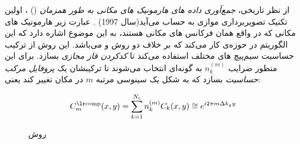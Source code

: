 از نظر تاریخی، 
\textit{جمع‌آوری داده های هارمونیک های مکانی به طور همزمان}
()
، اولین تکنیک تصویربرداری موازی به حساب می‌آید(سال 1997)
\cite{SMASH-1997}.
عبارت زیر هارمونیک های مکانی که در واقع همان فرکانس های مکانی هستند، به این موضوع اشاره دارد که  این الگوریتم در حوزه‌ی \kspace کار می‌کند که بر خلاف دو روش 
و  
می‌باشد. این روش از ترکیب حساسیت سیم‌پیچ های مختلف استفاده می‌کند تا \textit{کد‌کردن فاز مجازی} بسازد.
برای این منظور ضرایب $n_k^{(m)}$ به گونه‌ای انتخاب می‌شوند تا ترکیبشان یک \textit{پروفایل مرکب حساسیت}
 بسازد که به شکل یک سینوسی مرتبه $m$ در مکان تغییر کند یعنی:
 
 \removevspace
 \begin{equation}\label{eq:Ccomp}
 	C^\lrtext{comp}_m(x, y) =  \sum_{k=1}^{N_c}  n_k^{(m)} C_k(x,y) \cong e^{i2\pi m\Delta k_y y}
 \end{equation} 
 
 
 
\begin{figure}[t!]
	\centering
	\begin{RTLcopyrightBox}{\linewidth}{}
	\hfill
	\hfill
	\end{RTLcopyrightBox}
	\removevspace[2.5]
	\caption{روش }
\end{figure}





